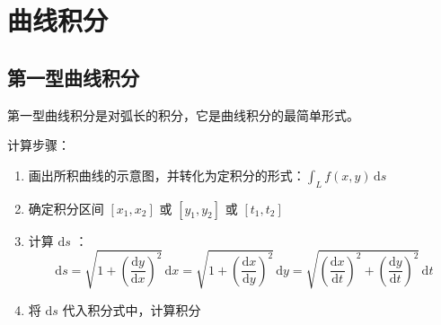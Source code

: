 \chapter{曲线积分}

\section{第一型曲线积分}

第一型曲线积分是对弧长的积分，它是曲线积分的最简单形式。

计算步骤：

\begin{enumerate}
    \item 画出所积曲线的示意图，并转化为定积分的形式：$\int_{L} f(x,y) \, \mathrm{d}s$
    \item 确定积分区间 $[x_1,x_2]$ 或 $[y_1,y_2]$ 或 $[t_1,t_2]$
    \item 计算 $\mathrm{d}s$ ：
          \[
              \mathrm{d}s = \sqrt{1+(\frac{\mathrm{d}y}{\mathrm{d}x})^2} \, \mathrm{d}x = \sqrt{1+(\frac{\mathrm{d}x}{\mathrm{d}y})^2} \, \mathrm{d}y = \sqrt{(\frac{\mathrm{d}x}{\mathrm{d}t})^2+(\frac{\mathrm{d}y}{\mathrm{d}t})^2} \, \mathrm{d}t
          \]
    \item 将 $\mathrm{d}s$ 代入积分式中，计算积分
\end{enumerate}